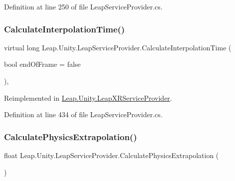 Definition at line 250 of file Leap\+Service\+Provider.\+cs.

\mbox{\label{class_leap_1_1_unity_1_1_leap_service_provider_a54a106ef4054e95402df75c45a7bc321}} 
\subsubsection{\texorpdfstring{CalculateInterpolationTime()}{CalculateInterpolationTime()}}
{\footnotesize\ttfamily virtual long Leap.\+Unity.\+Leap\+Service\+Provider.\+Calculate\+Interpolation\+Time (\begin{DoxyParamCaption}\item[{bool}]{end\+Of\+Frame = {\ttfamily false} }\end{DoxyParamCaption})\hspace{0.3cm}{\ttfamily [protected]}, {\ttfamily [virtual]}}



Reimplemented in \mbox{\hyperlink{class_leap_1_1_unity_1_1_leap_x_r_service_provider_aafadeb0206fa3309e894ca7241535e81}{Leap.\+Unity.\+Leap\+X\+R\+Service\+Provider}}.



Definition at line 434 of file Leap\+Service\+Provider.\+cs.

\mbox{\label{class_leap_1_1_unity_1_1_leap_service_provider_ad930af3ae3d63279248bd7f41ab58671}} 
\subsubsection{\texorpdfstring{CalculatePhysicsExtrapolation()}{CalculatePhysicsExtrapolation()}}
{\footnotesize\ttfamily float Leap.\+Unity.\+Leap\+Service\+Provider.\+Calculate\+Physics\+Extrapolation (\begin{DoxyParamCaption}{ }\end{DoxyParamCaption})}



